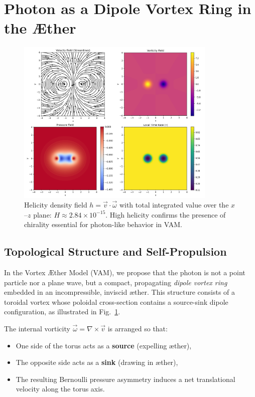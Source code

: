 \section{Photon as a Dipole Vortex Ring in the Æther}

\begin{figure}[H]
    \centering
    \includegraphics[width=0.85\textwidth]{images/01-streamlinesDiPole}
    \caption{Helicity density field $h = \vec{v} \cdot \vec{\omega}$ with total integrated value over the $x$–$z$ plane: $H \approx 2.84 \times 10^{-15}$. High helicity confirms the presence of chirality essential for photon-like behavior in VAM.}
    \label{fig:photon_toroid}
\end{figure}

\subsection{Topological Structure and Self-Propulsion}

In the Vortex Æther Model (VAM), we propose that the photon is not a point particle nor a plane wave, but a compact, propagating \textit{dipole vortex ring} embedded in an incompressible, inviscid æther. This structure consists of a toroidal vortex whose poloidal cross-section contains a source-sink dipole configuration, as illustrated in Fig.~\ref{fig:photon_toroid}.

The internal vorticity $\vec{\omega} = \nabla \times \vec{v}$ is arranged so that:

\begin{itemize}
    \item One side of the torus acts as a \textbf{source} (expelling æther),
    \item The opposite side acts as a \textbf{sink} (drawing in æther),
    \item The resulting Bernoulli pressure asymmetry induces a net translational velocity along the torus axis.
\end{itemize}

